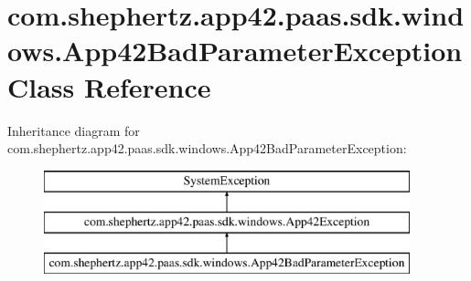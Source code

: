 \hypertarget{classcom_1_1shephertz_1_1app42_1_1paas_1_1sdk_1_1windows_1_1_app42_bad_parameter_exception}{\section{com.\+shephertz.\+app42.\+paas.\+sdk.\+windows.\+App42\+Bad\+Parameter\+Exception Class Reference}
\label{classcom_1_1shephertz_1_1app42_1_1paas_1_1sdk_1_1windows_1_1_app42_bad_parameter_exception}
}
Inheritance diagram for com.\+shephertz.\+app42.\+paas.\+sdk.\+windows.\+App42\+Bad\+Parameter\+Exception\+:\begin{figure}[H]
\begin{center}
\leavevmode
\includegraphics[height=3.000000cm]{classcom_1_1shephertz_1_1app42_1_1paas_1_1sdk_1_1windows_1_1_app42_bad_parameter_exception}
\end{center}
\end{figure}
